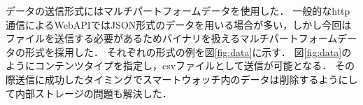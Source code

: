 \begin{table}[ht]
    \centering
    \caption{角速度データの形式}
    \label{table:gyro}
\end{table}
データの送信形式にはマルチパートフォームデータを使用した．
一般的なhttp通信によるWebAPIではJSON形式のデータを用いる場合が多い，しかし今回はファイルを送信する必要があるためバイナリを扱えるマルチパートフォームデータの形式を採用した．
それぞれの形式の例を図\ref{fig:data}に示す．
図\ref{fig:data}のようにコンテンツタイプを指定し，csvファイルとして送信が可能となる．
その際送信に成功したタイミングでスマートウォッチ内のデータは削除するようにして内部ストレージの問題も解決した．

